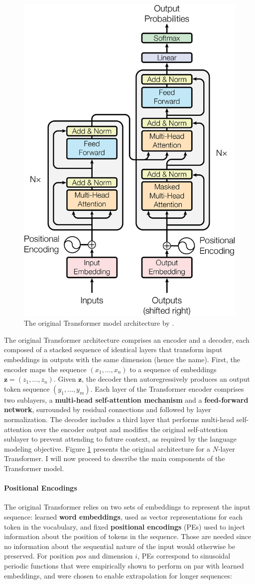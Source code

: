 \documentclass[a4paper, nobind]{templates/ociamthesis}
\begin{document}
\begin{figure}

{\centering \includegraphics[width=0.5\linewidth]{figures/2_transformer} 

}

\caption{The original Transformer model architecture by \textcite{vaswani-etal-2017-attention}.}\label{fig:transformer}
\end{figure}

The original Transformer architecture comprises an encoder and a decoder, each composed of a stacked sequence of identical layers that transform input embeddings in outputs with the same dimension (hence the name). First, the encoder maps the sequence \((x_1, \dots, x_n)\) to a sequence of embeddings \(\boldsymbol z = (z_1, \dots, z_n)\). Given \(\boldsymbol z\), the decoder then autoregressively produces an output token sequence \((y_1, \dots, y_m)\). Each layer of the Transformer encoder comprises two sublayers, a \textbf{multi-head self-attention mechanism} and a \textbf{feed-forward network}, surrounded by residual connections and followed by layer normalization. The decoder includes a third layer that performs multi-head self-attention over the encoder output and modifies the original self-attention sublayer to prevent attending to future context, as required by the language modeling objective. Figure \ref{fig:transformer} presents the original architecture for a \(N\)-layer Transformer. I will now proceed to describe the main components of the Transformer model.

\paragraph{Positional Encodings} The original Transformer relies on two sets of embeddings to represent the input sequence: learned \textbf{word embeddings}, used as vector representations for each token in the vocabulary, and fixed \textbf{positional encodings} (PEs) used to inject information about the position of tokens in the sequence. Those are needed since no information about the sequential nature of the input would otherwise be preserved. For position \(pos\) and dimension \(i\), PEs correspond to sinusoidal periodic functions that were empirically shown to perform on par with learned embeddings, and were chosen to enable extrapolation for longer sequences:
\end{document}
